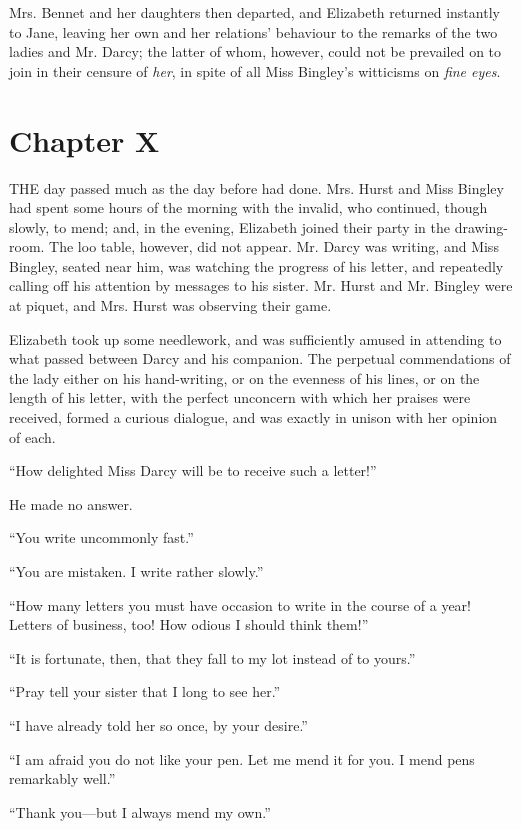 \documentclass[12pt,openright]{book}
\begin{document}
Mrs. Bennet and her daughters then departed, and Elizabeth returned instantly to Jane, leaving her own and her relations’ behaviour to the remarks of the two ladies and Mr. Darcy; the latter of whom, however, could not be prevailed on to join in their censure of \textit{her}, in spite of all Miss Bingley’s witticisms on \textit{fine eyes}.

\chapter{Chapter X}

\noindent  THE day passed much as the day before had done. Mrs. Hurst and Miss Bingley had spent some hours of the morning with the invalid, who continued, though slowly, to mend; and, in the evening, Elizabeth joined their party in the drawing-room. The loo table, however, did not appear. Mr. Darcy was writing, and Miss Bingley, seated near him, was watching the progress of his letter, and repeatedly calling off his attention by messages to his sister. Mr. Hurst and Mr. Bingley were at piquet, and Mrs. Hurst was observing their game.

Elizabeth took up some needlework, and was sufficiently amused in attending to what passed between Darcy and his companion. The perpetual commendations of the lady either on his hand-writing, or on the evenness of his lines, or on the length of his letter, with the perfect unconcern with which her praises were received, formed a curious dialogue, and was exactly in unison with her opinion of each.

“How delighted Miss Darcy will be to receive such a letter!”

He made no answer.

“You write uncommonly fast.”

“You are mistaken. I write rather slowly.”

“How many letters you must have occasion to write in the course of a year! Letters of business, too! How odious I should think them!”

“It is fortunate, then, that they fall to my lot instead of to yours.”

“Pray tell your sister that I long to see her.”

“I have already told her so once, by your desire.”

“I am afraid you do not like your pen. Let me mend it for you. I mend pens remarkably well.”

“Thank you—but I always mend my own.”
\end{document}
